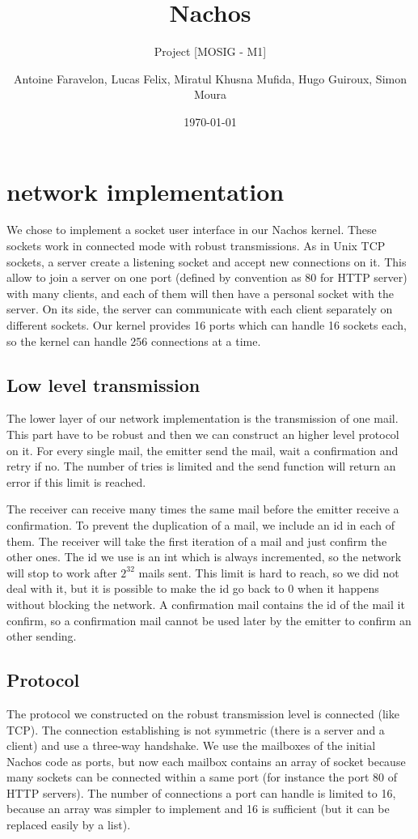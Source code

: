\documentclass[a4paper,10pt]{article}
\title{Nachos}
\subtitle{Project [MOSIG - M1]}
\author{Antoine Faravelon, Lucas Felix, Miratul Khusna Mufida, Hugo Guiroux, Simon Moura}
\date{\today}
\begin{document}
\maketitle

\section{network implementation}
	We chose to implement a socket user interface in our Nachos kernel. These sockets work in connected mode with robust transmissions.
As in Unix TCP sockets, a server create a listening socket and accept new connections on it. This allow to join a server on one port (defined by convention as 80 for HTTP server) with many clients, and each of them will then have a personal socket with the server.
On its side, the server can communicate with each client separately on different sockets.
Our kernel provides 16 ports which can handle 16 sockets each, so the kernel can handle 256 connections at a time.

\subsection{Low level transmission}
	The lower layer of our network implementation is the transmission of one mail. This part have to be robust and then we can construct an higher level protocol on it.
For every single mail, the emitter send the mail, wait a confirmation and retry if no. The number of tries is limited and the send function will return an error if this limit is reached.

The receiver can receive many times the same mail before the emitter receive a confirmation. To prevent the duplication of a mail, we include an id in each of them. The receiver will take the first iteration of a mail and just confirm the other ones.
The id we use is an int which is always incremented, so the network will stop to work after $2^{32}$ mails sent. This limit is hard to reach, so we did not deal with it, but it is possible to make the id go back to 0 when it happens without blocking the network.
A confirmation mail contains the id of the mail it confirm, so a confirmation mail cannot be used later by the emitter to confirm an other sending.

\subsection{Protocol}
	The protocol we constructed on the robust transmission level is connected (like TCP). The connection establishing is not symmetric (there is a server and a client) and use a three-way handshake.
We use the mailboxes of the initial Nachos code as ports, but now each mailbox contains an array of socket because many sockets can be connected within a same port (for instance the port 80 of HTTP servers).
The number of connections a port can handle is limited to 16, because an array was simpler to implement and 16 is sufficient (but it can be replaced easily by a list).
\end{document}
